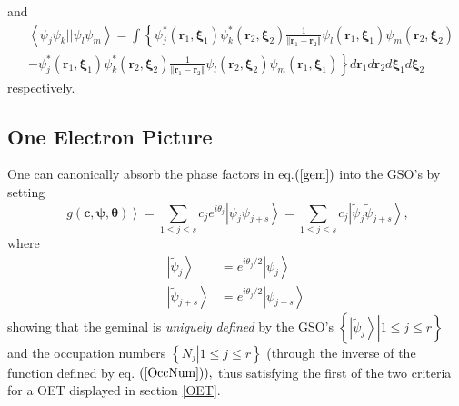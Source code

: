 \documentclass[aps,preprint]{revtex4}%
\begin{document}
and
\begin{align}
&  \left\langle \psi_{j}\psi_{k}||\psi_{l}\psi_{m}\right\rangle =\int\left\{
\psi_{j}^{\ast}\left(  \boldsymbol{r}_{1},\boldsymbol{\xi}_{1}\right)
\psi_{k}^{\ast}\left(  \boldsymbol{r}_{2},\boldsymbol{\xi}_{2}\right)
\frac{1}{\left\Vert \boldsymbol{r}_{1}-\boldsymbol{r}_{2}\right\Vert }\psi
_{l}\left(  \boldsymbol{r}_{1},\boldsymbol{\xi}_{1}\right)  \psi_{m}\left(
\boldsymbol{r}_{2},\boldsymbol{\xi}_{2}\right)  \right. \nonumber\\
&  -\left.  \psi_{j}^{\ast}\left(  \boldsymbol{r}_{1},\boldsymbol{\xi}%
_{1}\right)  \psi_{k}^{\ast}\left(  \boldsymbol{r}_{2},\boldsymbol{\xi}%
_{2}\right)  \frac{1}{\left\Vert \boldsymbol{r}_{1}-\boldsymbol{r}%
_{2}\right\Vert }\psi_{l}\left(  \boldsymbol{r}_{2},\boldsymbol{\xi}%
_{2}\right)  \psi_{m}\left(  \boldsymbol{r}_{1},\boldsymbol{\xi}_{1}\right)
\right\}  d\boldsymbol{r}_{1}d\boldsymbol{r}_{2}d\boldsymbol{\xi}%
_{1}d\boldsymbol{\xi}_{2}%
\end{align}
respectively.

\subsection{One Electron Picture\label{OneElecPic}}

One can canonically absorb the phase factors in eq.$\left(  \ref{gem}\right)
$ into the GSO's by setting
\begin{equation}
\left\vert g\left(  \boldsymbol{c},\boldsymbol{\psi},\boldsymbol{\theta
}\right)  \right\rangle =\sum_{1\leq j\leq s}c_{j}e^{i\theta_{j}}\left\vert
\psi_{j}\psi_{j+s}\right\rangle =\sum_{1\leq j\leq s}c_{j}\left\vert
\tilde{\psi}_{j}\tilde{\psi}_{j+s}\right\rangle ,
\end{equation}
where
\begin{align}
\left\vert \tilde{\psi}_{j}\right\rangle  &  =e^{i\theta_{j}/2}\left\vert
\psi_{j}\right\rangle \nonumber\\
\left\vert \tilde{\psi}_{j+s}\right\rangle  &  =e^{i\theta_{j}/2}\left\vert
\psi_{j+s}\right\rangle
\end{align}
showing that the geminal is \emph{uniquely defined} by the GSO's $\left\{
\left.  \left\vert \tilde{\psi}_{j}\right\rangle \right\vert 1\leq j\leq
r\right\}  $ and the occupation numbers $\left\{  \left.  N_{j}\right\vert
1\leq j\leq r\right\}  $ (through the inverse of the function defined by eq.
$\left(  \ref{OccNum}\right)  ),$ thus satisfying the first of the two
criteria for a OET displayed in section \ref{OET}.
\end{document}
